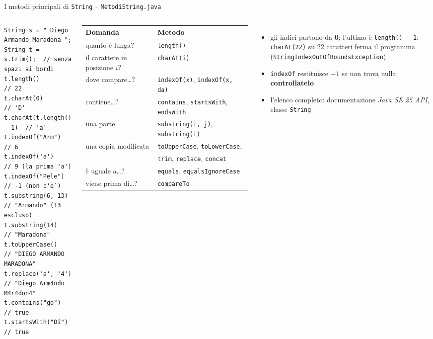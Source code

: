 \documentclass[10pt,aspectratio=169]{beamer}
\begin{document}
\begin{frame}[fragile]{I metodi principali di \texttt{String} -- \texttt{MetodiString.java}}
\begin{columns}[T]
\begin{lstlisting}[basicstyle=\ttfamily\scriptsize]
String s = " Diego Armando Maradona ";
String t = s.trim();  // senza spazi ai bordi
t.length()            // 22
t.charAt(0)           // 'D'
t.charAt(t.length() - 1)  // 'a'
t.indexOf("Arm")      // 6
t.indexOf('a')        // 9 (la prima 'a')
t.indexOf("Pele")     // -1 (non c'e`)
t.substring(6, 13)    // "Armando" (13 escluso)
t.substring(14)       // "Maradona"
t.toUpperCase()       // "DIEGO ARMANDO MARADONA"
t.replace('a', '4')   // "Diego Arm4ndo M4r4don4"
t.contains("go")      // true
t.startsWith("Di")    // true
\end{lstlisting}

\scriptsize
\renewcommand{\arraystretch}{1.15}
\begin{tabular}{ll}
\toprule
\textbf{Domanda} & \textbf{Metodo} \\
\midrule
quanto è lunga? & \texttt{length()} \\
il carattere in posizione $i$? & \texttt{charAt(i)} \\
dove compare\ldots? & \texttt{indexOf(x)}, \texttt{indexOf(x, da)} \\
contiene\ldots? & \texttt{contains}, \texttt{startsWith}, \texttt{endsWith} \\
una parte & \texttt{substring(i, j)}, \texttt{substring(i)} \\
una copia modificata & \texttt{toUpperCase}, \texttt{toLowerCase}, \\
 & \texttt{trim}, \texttt{replace}, \texttt{concat} \\
è uguale a\ldots? & \texttt{equals}, \texttt{equalsIgnoreCase} \\
viene prima di\ldots? & \texttt{compareTo} \\
\bottomrule
\end{tabular}
\small
\vspace{0.15cm}
\begin{itemize}\itemsep=1pt
    \item gli indici partono da \textbf{0}; l'ultimo è \texttt{length() - 1}; \texttt{charAt(22)} su 22 caratteri ferma il programma (\texttt{StringIndexOutOfBoundsException})
    \item \texttt{indexOf} restituisce $-1$ se non trova nulla: \textbf{controllatelo}
    \item l'elenco completo: documentazione \emph{Java SE 25 API}, classe \texttt{String}
\end{itemize}
\end{columns}
\end{frame}
\end{document}
